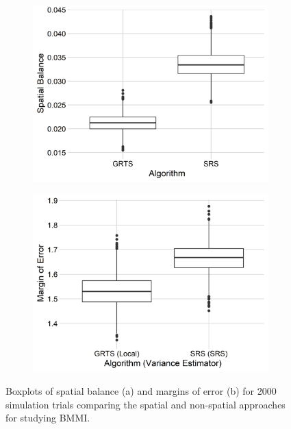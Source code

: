\documentclass[
  shortnames]{jss}
\begin{document}
\begin{figure}
\centering
\begin{subfigure}{0.45\textwidth}
  \centering
  \includegraphics[width = 1\linewidth]{images/cont_spb.jpeg}
  \caption{}
  \label{fig:cont_moe}
\end{subfigure}
\begin{subfigure}{0.45\textwidth}
  \centering
  \includegraphics[width = 1\linewidth]{images/cont_moe.jpeg}
  \caption{}
  \label{fig:cont_spb}
\end{subfigure}
\caption{Boxplots of spatial balance (a) and margins of error (b) for 2000 simulation trials comparing the spatial and non-spatial approaches for studying BMMI.}
\label{fig:cont}
\end{figure}
\end{document}
